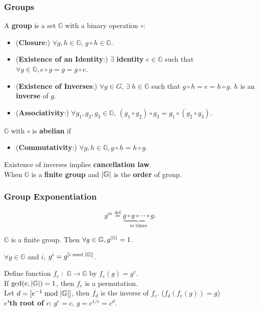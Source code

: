 \begin{frame}\frametitle{Groups}
A \textbf{group} is a set $\mathbb{G}$ with a binary operation $\circ$:
\begin{itemize}
\item (\textbf{Closure}:) $\forall g,h \in \mathbb{G}$, $g \circ h \in \mathbb{G}$.
\item (\textbf{Existence of an Identity}:) $\exists$ \textbf{identity} $e\in \mathbb{G}$ such that $\forall g\in \mathbb{G}, e \circ g = g = g \circ e$.
\item (\textbf{Existence of Inverses}:) $\forall g \in G$, $\exists\; h \in \mathbb{G}$ such that $g \circ h =e = h \circ g$. $h$ is an \textbf{inverse} of $g$.
\item (\textbf{Associativity}:) $\forall g_1,g_2,g_3 \in \mathbb{G}$, $(g_1\circ g_2)\circ g_3 = g_1 \circ (g_2 \circ g_3)$.
\end{itemize}
$\mathbb{G}$ with $\circ$ is \textbf{abelian} if
\begin{itemize}
\item (\textbf{Commutativity}:) $\forall g,h \in \mathbb{G}, g\circ h = h\circ g$.
\end{itemize}

Existence of inverses implies \textbf{cancellation law}.\\
When $\mathbb{G}$ is a \textbf{finite group} and $\lvert\mathbb{G}\rvert$ is the \textbf{order} of group.\\
\end{frame}
\begin{frame}\frametitle{Group Exponentiation}
\[ g^m \overset{\text{def}}{=} \underbrace{g\circ g\circ \cdots \circ g}_{m\; \text{times}}. \]
\begin{theorem}
$\mathbb{G}$ is a finite group. Then $\forall g \in \mathbb{G}, g^{\lvert\mathbb{G}\rvert}=1$.
\end{theorem}
\begin{corollary}
$\forall g \in \mathbb{G}$ and $i$, $g^i = g^{[i \bmod {\lvert\mathbb{G}\rvert}]}$.
\end{corollary}
\begin{corollary}
Define function $f_e\;:$ $\mathbb{G} \to \mathbb{G}$ by $f_e(g) =g^e$. \\
If $\gcd(e,\lvert\mathbb{G}\rvert)=1$, then $f_e$ is a permutation. \\
Let $d = [e^{-1} \bmod {\lvert\mathbb{G}\rvert}]$, then $f_d$ is the inverse of $f_e$. ($f_d(f_e(g))=g$)\\
\textbf{$e$'th root of $c$}: $g^e = c$, $g = c^{1/e} = c^{d}$. 
\end{corollary}
\end{frame}
